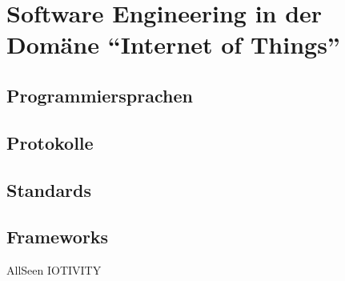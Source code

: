 \chapter{Software Engineering in der Domäne "`Internet of Things"'}


\section{Programmiersprachen}


\section{Protokolle}


\section{Standards}


\section{Frameworks}
AllSeen
IOTIVITY